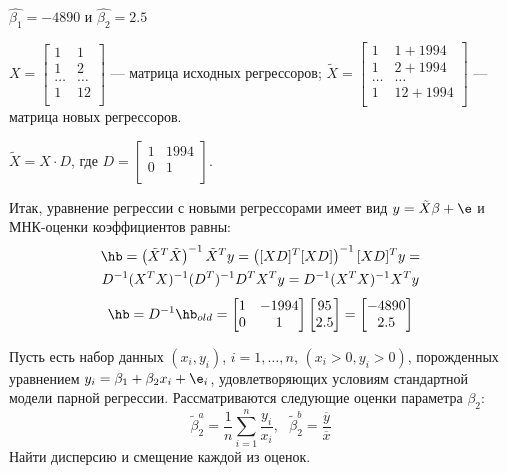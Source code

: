 \documentclass[pdftex,11pt,openany]{book}\usepackage[]{graphicx}\usepackage[]{color}
\begin{document}
\begin{solution}
$\hat{\beta_1} = -4890$ и $\hat{\beta_2} = 2.5$

$X = \begin{bmatrix}
1 & 1 \\
1 & 2 \\
\ldots & \ldots \\
1 & 12 \\
\end{bmatrix}$ --- матрица исходных регрессоров; $\tilde{X} = \begin{bmatrix}
1 & 1+1994\\
1 & 2+1994 \\
\ldots & \ldots \\
1 & 12+1994 \\
\end{bmatrix}$ --- матрица новых регрессоров.

$\tilde{X} = X \cdot D$, где $D = \begin{bmatrix}
1 & 1994 \\
0 & 1 \\
\end{bmatrix}$.

Итак, уравнение регрессии с новыми регрессорами имеет вид $y = \tilde{X}\beta + \e$ и МНК-оценки коэффициентов равны:
\begin{multline}
\hb = \left( \tilde{X}^T \tilde{X} \right)^{-1} \tilde{X}^T y = \left( [XD]^T [XD] \right)^{-1} [XD]^T y = \\
D^{-1} (X^T X)^{-1} (D^T)^{-1} D^T X^T y = D^{-1} (X^T X)^{-1}X^T y
\end{multline}
\[
\hb = D^{-1}\hb_{old} = \begin{bmatrix}
1 & -1994 \\
0 & 1 \\
\end{bmatrix} \begin{bmatrix}
95 \\
2.5 \\
\end{bmatrix} = \begin{bmatrix}
-4890 \\
2.5 \\
\end{bmatrix}
\]
\end{solution}

\begin{problem}
Пусть есть набор данных $(x_i, y_i)$, $i = 1, \ldots, n$, $(x_i>0, y_i>0)$, порожденных уравнением $y_i = \beta_1 + \beta_2 x_i + \e_i$, удовлетворяющих условиям стандартной модели парной регрессии.
Рассматриваются следующие оценки параметра $\beta_2$:
$$\tilde{\beta}_2^a = \frac{1}{n}\sum_{i=1}^n \frac{y_i}{x_i}, \text{ } \tilde{\beta}_2^b = \frac{\overline{y}}{\overline{x}}$$
Найти дисперсию и смещение каждой из оценок.
\end{problem}
\end{document}

